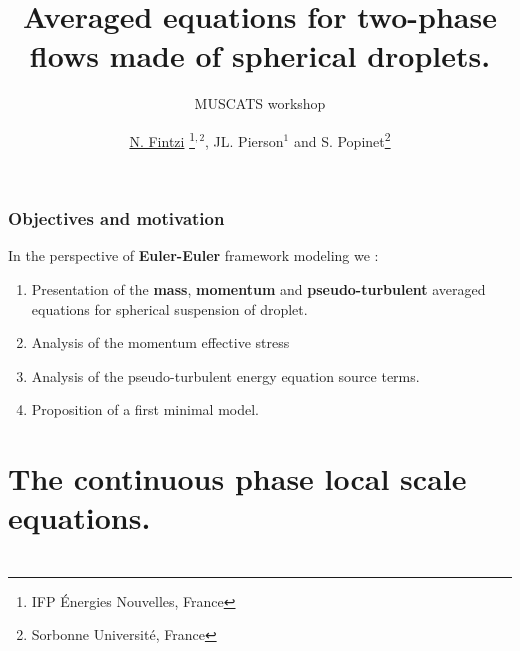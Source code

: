 \documentclass{sintefbeamer}
\title{Averaged equations for two-phase flows made of spherical droplets. }
\subtitle{MUSCATS workshop}
\author{\underline{N. Fintzi} \footnote{IFP \'Energies Nouvelles, France}$^{,2}$, JL. Pierson$^1$ and S. Popinet\footnote{Sorbonne Universit\'e, France}}
\begin{document}
\maketitle
\section*{}

\begin{frame}
  \frametitle{Objectives and motivation}



In the perspective of \textbf{Euler-Euler} framework modeling we : 
\vfill
\begin{enumerate}
  \item Presentation of the \textbf{mass}, \textbf{momentum} and \textbf{pseudo-turbulent} averaged equations for spherical suspension of droplet. 
  \item Analysis of the momentum effective stress
  \item Analysis of the pseudo-turbulent energy equation source terms. 
  \item Proposition of a first minimal model. 
\end{enumerate}





\end{frame}

\section{The continuous phase local scale equations.}
\section*{}
\end{document}
